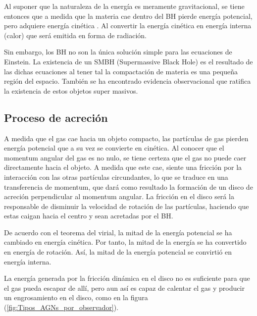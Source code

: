 Al suponer que la naturaleza de la energía es meramente gravitacional, se tiene entonces que a medida que la materia cae dentro del BH pierde energía potencial, pero adquiere energía cinética . Al convertir la energía cinética en energía interna (calor) que será emitida en forma de radiación.

Sin embargo, los BH no son la única solución simple para las ecuaciones de Einstein. La existencia de un SMBH (Supermassive Black Hole) es el resultado de las dichas ecuaciones al tener tal la compactación de materia es una pequeña región del espacio.
También se ha encontrado evidencia observacional que ratifica la existencia de estos objetos super masivos. 

	\subsection{Proceso de acreción}
	\label{subsec:Acretion}

A medida que el gas cae hacia un objeto compacto, las partículas de gas pierden energía potencial que a su vez se convierte en cinética. Al conocer que el momentum angular del gas es no nulo, se tiene certeza que el gas no puede caer directamente hacia el objeto. A medida que este cae, siente una fricción por la interacción con las otras partículas circundantes, lo que se traduce en una transferencia de momentum, que dará como resultado la formación de un disco de acreción perpendicular al momentum angular. La fricción en el disco será la responsable de disminuir la velocidad de rotación de las partículas, haciendo que estas caigan hacia el centro y sean acretadas por el BH.  

De acuerdo con el teorema del virial, la mitad de la energía potencial se ha cambiado en energía cinética. Por tanto, la mitad de la energía se ha convertido en energía de rotación. Así, la mitad de la energía potencial se convirtió en energía interna. 

La energía generada por la fricción dinámica en el disco no es suficiente para que el gas pueda escapar de allí, pero aun así es capaz de calentar el gas y producir un engrosamiento en el disco, como en la figura (\ref{fig:Tipos_AGNs_por_observador}).


